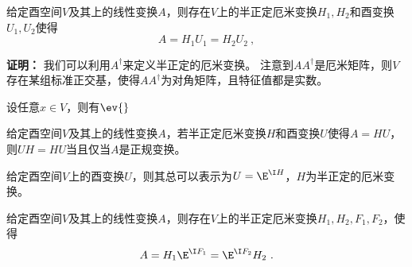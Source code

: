 
\begin{theorem}{}
给定酉空间$V$及其上的线性变换$A$，则存在$V$上的半正定厄米变换$H_1,H_2$和酉变换$U_1,U_2$使得
\begin{equation}
A=H_1U_1=H_2U_2~,
\end{equation}
\end{theorem}
\textbf{证明：}
我们可以利用$A^{\dagger}$来定义半正定的厄米变换。
注意到$AA^{\dagger}$是厄米矩阵，则$V$存在某组标准正交基，使得$AA^{\dagger}$为对角矩阵，且特征值都是实数。

设任意$x\in V$，则有$\ev{}$

\begin{theorem}{}
给定酉空间$V$及其上的线性变换$A$，若半正定厄米变换$H$和酉变换$U$使得$A=HU$，则$UH=HU$当且仅当$A$是正规变换。
\end{theorem}
\begin{theorem}{}
给定酉空间$V$上的酉变换$U$，则其总可以表示为$U=\E^{\I H}$，$H$为半正定的厄米变换。
\end{theorem}
\begin{corollary}{}
给定酉空间$V$及其上的线性变换$A$，则存在$V$上的半正定厄米变换$H_1,H_2,F_1,F_2$，使得
\begin{equation}
A=H_1\E^{\I F_1}=\E^{\I F_2}H_2~.
\end{equation}
\end{corollary}
